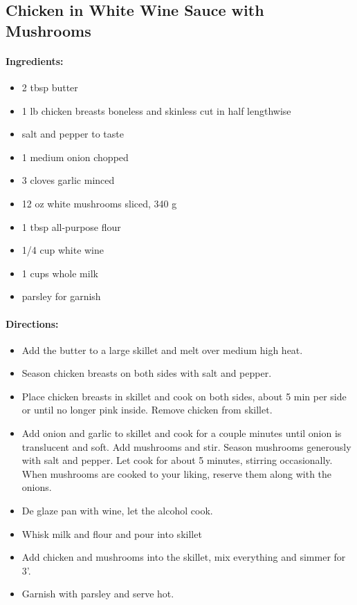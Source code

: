 \documentclass{article}
\begin{document}
\subsection{Chicken in White Wine Sauce with Mushrooms}

\paragraph{Ingredients:}
\begin{itemize}
    \item 2 tbsp butter
    \item 1 lb chicken breasts boneless and skinless cut in half lengthwise
    \item salt and pepper to taste
    \item 1 medium onion chopped
    \item 3 cloves garlic minced
    \item 12 oz white mushrooms sliced, 340 g
    \item 1 tbsp all-purpose flour
    \item 1/4 cup white wine
    \item 1 cups whole milk
    \item parsley for garnish
\end{itemize}

\paragraph{Directions:}
\begin{itemize}
    \item Add the butter to a large skillet and melt over medium high heat.
    \item Season chicken breasts on both sides with salt and pepper.
    \item Place chicken breasts in skillet and cook on both sides, about 5 min per side or until no longer pink inside. Remove chicken from skillet.
    \item Add onion and garlic to skillet and cook for a couple minutes until onion is translucent and soft. Add mushrooms and stir. Season mushrooms generously with salt and pepper. Let cook for about 5 minutes, stirring occasionally. When mushrooms are cooked to your liking, reserve them along with the onions.
    \item De glaze pan with wine, let the alcohol cook.
    \item Whisk milk and flour and pour into skillet
    \item Add chicken and mushrooms into the skillet, mix everything and simmer for 3'.
    \item Garnish with parsley and serve hot.
\end{itemize}
\end{document}
